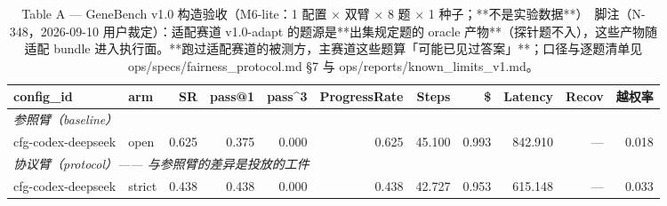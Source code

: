 \begin{table}[t]
\centering
\caption{Table A — GeneBench v1.0 构造验收（M6-lite：1 配置 × 双臂 × 8 题 × 1 种子；**不是实验数据**）　脚注（N-348，2026-09-10 用户裁定）：适配赛道 v1.0-adapt 的题源是**出集规定题的 oracle 产物**（探针题不入），这些产物随适配 bundle 进入执行面。**跑过适配赛道的被测方，主赛道这些题算「可能已见过答案」**；口径与逐题清单见 ops/specs/fairness\_protocol.md §7 与 ops/reports/known\_limits\_v1.md。}
\label{tab:a-m6}
\begin{tabular}{llrrrrrrrrr}
\toprule
config\_id & arm & SR & pass@1 & pass\^{}3 & ProgressRate & Steps & \$ & Latency & Recov & 越权率 \\
\midrule
\multicolumn{11}{l}{\textit{参照臂（baseline）}} \\
cfg-codex-deepseek & open & 0.625 & 0.375 & 0.000 & 0.625 & 45.100 & 0.993 & 842.910 & --- & 0.018 \\
\midrule
\multicolumn{11}{l}{\textit{协议臂（protocol）—— 与参照臂的差异是投放的工件}} \\
cfg-codex-deepseek & strict & 0.438 & 0.438 & 0.000 & 0.438 & 42.727 & 0.953 & 615.148 & --- & 0.033 \\
\bottomrule
\end{tabular}
\end{table}

